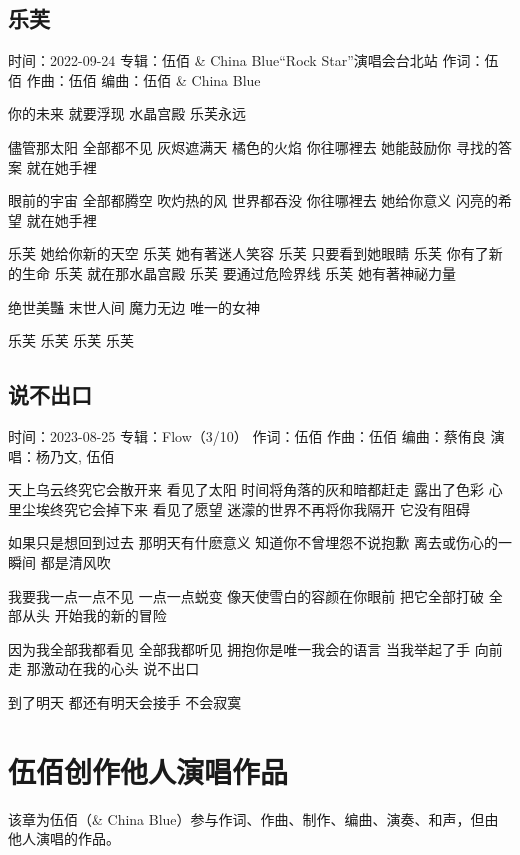 \documentclass[UTF8,a4paper,oneside,twocolumn,12pt]{ctexbook}
\newcommand{\infopair}[2]{\textbullet #1：#2}
\newcommand{\zc}[1][伍佰]{\infopair{作词}{#1}}
\newcommand{\zq}[1][伍佰]{\infopair{作曲}{#1}}
\newcommand{\bq}[1][伍佰]{\infopair{编曲}{#1}}
\newcommand{\zj}[1]{\infopair{专辑}{#1}}
\newcommand{\sj}[1]{\infopair{时间}{#1}}
\newenvironment{info}{\begin{flushleft}\kaishu
	}
	{\end{flushleft}\normalsize\yahei\par}
\newenvironment{lyric}{
	}
{}
\begin{document}
\section{乐芙}%
\begin{info}
	\sj{2022-09-24}
	\zj{伍佰 \& China Blue“Rock Star”演唱会台北站}
	\zc
	\zq
	\bq[伍佰 \& China Blue]
\end{info}
\begin{lyric}%
	你的未来 就要浮现 水晶宫殿 乐芙永远

	儘管那太阳 全部都不见 灰烬遮满天 橘色的火焰
	你往哪裡去 她能鼓励你 寻找的答案 就在她手裡

	眼前的宇宙 全部都腾空 吹灼热的风 世界都吞没
	你往哪裡去 她给你意义 闪亮的希望 就在她手裡

	乐芙 她给你新的天空 乐芙 她有著迷人笑容
	乐芙 只要看到她眼睛 乐芙 你有了新的生命
	乐芙 就在那水晶宫殿 乐芙 要通过危险界线
	乐芙 她有著神祕力量

	绝世美豔 末世人间 魔力无边 唯一的女神

	乐芙 乐芙 乐芙 乐芙
\end{lyric}

\section{说不出口}
\begin{info}
	\sj{2023-08-25}
	\zj{Flow（3/10）}
	\zc
	\zq
	\bq[蔡侑良]
	\infopair{演唱}{杨乃文, 伍佰}
\end{info}
\begin{lyric}%
	天上乌云终究它会散开来 看见了太阳
	时间将角落的灰和暗都赶走 露出了色彩
	心里尘埃终究它会掉下来 看见了愿望
	迷濛的世界不再将你我隔开 它没有阻碍

	如果只是想回到过去 那明天有什麽意义
	知道你不曾埋怨不说抱歉 离去或伤心的一瞬间
	都是清风吹

	我要我一点一点不见 一点一点蜕变
	像天使雪白的容颜在你眼前
	把它全部打破 全部从头
	开始我的新的冒险

	因为我全部我都看见 全部我都听见
	拥抱你是唯一我会的语言
	当我举起了手 向前走
	那激动在我的心头 说不出口

	到了明天 都还有明天会接手
	不会寂寞
\end{lyric}

\chapter{伍佰创作他人演唱作品}
该章为伍佰（\& China Blue）参与作词、作曲、制作、编曲、演奏、和声，但由他人演唱的作品。
\end{document}
